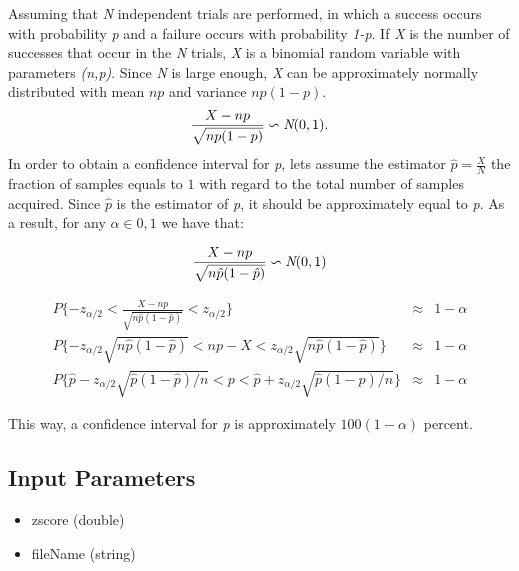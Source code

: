 Assuming that \textit{N} independent trials are performed, in which a success occurs with probability \textit{p} and a failure occurs with probability \textit{1-p}. If \textit{X} is the number of successes that occur in the \textit{N} trials, \textit{X} is a binomial random variable with parameters \textit{(n,p)}. Since \textit{N} is large enough, \textit{X} can be approximately normally distributed with mean $np$ and variance $np(1-p)$.
\begin{equation}\label{eq:binomialtonormal}
  \frac{X-np}{\sqrt{np(1-p)}}\backsim \emph{N}(0,1).
\end{equation}
In order to obtain a confidence interval for \textit{p}, lets assume the estimator $\hat{p}=\frac{X}{N}$ the fraction of samples equals to $1$ with regard to the total number of samples acquired. Since $\hat{p}$ is the estimator of \textit{p}, it should be approximately equal to \textit{p}. As a result, for any $\alpha \in {0,1}$ we have that:

\begin{equation}\label{eq:eq1}
   \frac{X-np}{\sqrt{n\hat{p}(1-\hat{p})}} \backsim \emph{N}(0,1) 
\end{equation}


\begin{align}\label{eq:eq2}
  \nonumber
  P \{-z_{\alpha/2} < \frac{X-np}{\sqrt{n\hat{p}(1-\hat{p})}} < z_{\alpha/2}\} &\approx& 1-\alpha \\ \nonumber
  P \{-z_{\alpha/2}\sqrt{n\hat{p}(1-\hat{p})}<np-X<z_{\alpha/2}\sqrt{n\hat{p}(1-\hat{p})}\} &\approx& 1-\alpha \\
  P\{\hat{p}-z_{\alpha/2}\sqrt{\hat{p}(1-\hat{p})/n} <p<\hat{p}+z_{\alpha/2}\sqrt{\hat{p}(1-\hat{p})/n}\} &\approx& 1-\alpha
\end{align}

This way, a confidence interval for \textit{p} is approximately $100(1-\alpha)$ percent.

\subsection*{Input Parameters}

	\begin{itemize}
		\item zscore \linebreak
		(double)
    \item fileName \linebreak
		(string)
	
	\end{itemize}

